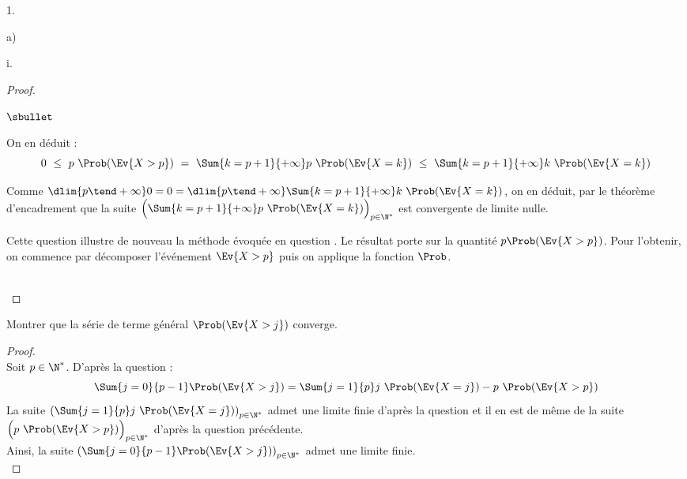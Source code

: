 \documentclass[11pt]{article}%
\begin{document}
\begin{noliste}{1.}
\begin{noliste}{a)}
\begin{nonoliste}{i.}
\begin{proof}
\begin{noliste}{$\sbullet$}
        \item On en déduit :
          \[
          0 \ \leq \ p \ \Prob(\Ev{X > p}) \ = \ \Sum{k =
            p+1}{+\infty} p \ \Prob(\Ev{X = k}) \ \leq \ \Sum{k =
            p+1}{+\infty} k \ \Prob(\Ev{X = k})
          \]

        \item Comme $\dlim{p \tend +\infty} 0 = 0 = \dlim{p \tend
            +\infty} \Sum{k = p+1}{+\infty} k \ \Prob(\Ev{X = k})$, on
          en déduit, par le théorème d'encadrement que la suite
          $\Big(\Sum{k = p+1}{+\infty} p \ \Prob(\Ev{X = k}) \Big)_{p
            \in \N^*}$ est convergente de limite nulle.
        \end{noliste}
        \begin{remark}%
          Cette question illustre de nouveau la méthode évoquée en
          question . Le résultat porte sur la quantité $p
          \Prob(\Ev{X > p})$. Pour l'obtenir, on commence par
          décomposer l'événement $\Ev{X > p}$ puis on applique la
          fonction $\Prob$.
        \end{remark}~\\[-1.2cm]
      \end{proof}

    \item Montrer que la série de terme général $\Prob(\Ev{X>j})$
      converge.

      \begin{proof}~\\
        Soit $p \in \N^*$. D'après la question  :
        \[
        \Sum{j=0}{p-1} \Prob(\Ev{X > j}) = \Sum{j=1}{p} j \ \Prob(\Ev{X
          = j}) - p \ \Prob(\Ev{X > p})
        \]
        La suite $\left( \Sum{j=1}{p} j \ \Prob(\Ev{X = j}) \right)_{p
          \in \N^*}$ admet une limite finie d'après la question
         et il en est de même de la suite $\Big( p \
        \Prob(\Ev{X > p}) \Big)_{p \in \N^*}$ d'après la question
        précédente. \\ %
        Ainsi, la suite $\left( \Sum{j=0}{p-1} \Prob(\Ev{X > j})
        \right)_{p \in \N^*}$ admet une limite finie.%
        ~\\[-1cm]
    \end{proof}



\end{nonoliste}
\end{noliste}
\end{noliste}
\end{document}
